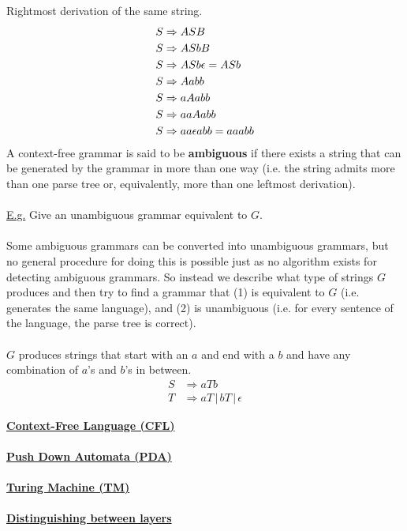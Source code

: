 \documentclass[8pt,letterpaper,twocolumn]{article}
\begin{document}
  Rightmost derivation of the same string.
  \begin{align} %
    \setcounter{equation}{0} %
    S &\Rightarrow ASB \\
    \setcounter{equation}{5}
    S &\Rightarrow ASbB \\
    S &\Rightarrow ASb \epsilon = ASb \\
    \setcounter{equation}{1}
    S &\Rightarrow Aabb \\
    \setcounter{equation}{3}
    S &\Rightarrow aAabb \\
    \setcounter{equation}{3}
    S &\Rightarrow aaAabb \\
    S &\Rightarrow aa \epsilon abb = aaabb
  \end{align}
A context-free grammar is said to be \textbf{ambiguous} if there exists a string that can be
generated by the grammar in more than one way (i.e. the string admits more than one parse tree or,
equivalently, more than one leftmost derivation). \\
\\
\underline{E.g.} %
  Give an unambiguous grammar equivalent to $G$. \\
  \\
  Some ambiguous grammars can be converted into unambiguous grammars, but no general procedure
  for doing this is possible just as no algorithm exists for detecting ambiguous grammars.
  So instead we describe what type of strings $G$ produces and then try to find a grammar that
  (1) is equivalent to $G$ (i.e. generates the same language), and (2) is unambiguous
  (i.e. for every sentence of the language, the parse tree is correct).\\
  \\
  $G$ produces strings that start with an $a$ and end with a $b$ and have any combination of $a$'s and
  $b$'s in between.
  \begin{align*}
    S &\Rightarrow aTb \\
    T &\Rightarrow aT \,|\, bT \,|\, \epsilon
  \end{align*}

\underline{\textbf{Context-Free Language (CFL)}} \\
\\
\underline{\textbf{Push Down Automata (PDA)}} \\
\\
\underline{\textbf{Turing Machine (TM)}} \\
\\
\underline{\textbf{Distinguishing between layers}} \\
\end{document}
